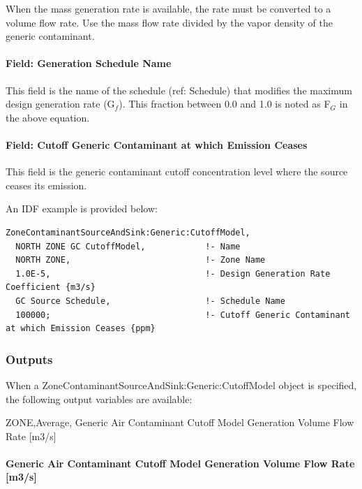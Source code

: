 When the mass generation rate is available, the rate must be converted to a volume flow rate. Use the mass flow rate divided by the vapor density of the generic contaminant.

\paragraph{Field: Generation Schedule Name}\label{field-generation-schedule-name-1}

This field is the name of the schedule (ref: Schedule) that modifies the maximum design generation rate (G\(_{f}\)). This fraction between 0.0 and 1.0 is noted as F\(_{G}\) in the above equation.

\paragraph{Field: Cutoff Generic Contaminant at which Emission Ceases}\label{field-cutoff-generic-contaminant-at-which-emission-ceases}

This field is the generic contaminant cutoff concentration level where the source ceases its emission.

An IDF example is provided below:

\begin{lstlisting}
ZoneContaminantSourceAndSink:Generic:CutoffModel,
  NORTH ZONE GC CutoffModel,            !- Name
  NORTH ZONE,                           !- Zone Name
  1.0E-5,                               !- Design Generation Rate Coefficient {m3/s}
  GC Source Schedule,                   !- Schedule Name
  100000;                               !- Cutoff Generic Contaminant at which Emission Ceases {ppm}
\end{lstlisting}

\subsubsection{Outputs}\label{outputs-9-003}

When a ZoneContaminantSourceAndSink:Generic:CutoffModel object is specified, the following output variables are available:

ZONE,Average, Generic Air Contaminant Cutoff Model Generation Volume Flow Rate {[}m3/s{]}

\paragraph{Generic Air Contaminant Cutoff Model Generation Volume Flow Rate {[}m3/s{]}}\label{generic-air-contaminant-cutoff-model-generation-volume-flow-rate-m3s}


